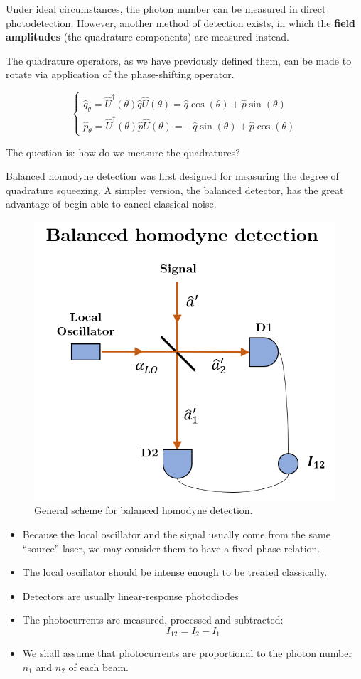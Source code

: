 \documentclass[12pt,a4paper]{report}
\begin{document}
Under ideal circumstances, the photon number can be measured in direct photodetection. However, another method of detection exists, in which the \textbf{field amplitudes} (the quadrature components) are measured instead.

The quadrature operators, as we have previously defined them, can be made to rotate via application of the phase-shifting operator.

\begin{equation*}
    \begin{cases}
        \hat q_\theta=\hat U^{\dag}(\theta)\hat q \hat U(\theta)=\hat q \cos(\theta)+\hat p \sin(\theta)\\[0.3cm]
        \hat p_\theta=\hat U^{\dag}(\theta)\hat p \hat U(\theta)=-\hat q \sin(\theta)+\hat p \cos(\theta)
    \end{cases}
\end{equation*}

The question is: how do we measure the quadratures?

Balanced homodyne detection was first designed for measuring the degree of quadrature squeezing. A simpler version, the balanced detector, has the great advantage of begin able to cancel classical noise.

\begin{figure}[H]
    \centering
    \includegraphics[width=0.6\linewidth]{BHD.png}
    \caption{General scheme for balanced homodyne detection.}
    \label{BHD}
\end{figure}

\begin{itemize}
    \item Because the local oscillator and the signal usually come from the same ``source'' laser, we may consider them to have a fixed phase relation.
    \item The local oscillator should be intense enough to be treated classically.
    \item Detectors are usually linear-response photodiodes
    \item The photocurrents are measured, processed and subtracted:
    \begin{equation}
        I_{12}=I_2-I_1
    \end{equation}
    \item We shall assume that photocurrents are proportional to the photon number $\hat n_1$ and $\hat n _2$ of each beam.
\end{itemize}
\end{document}
